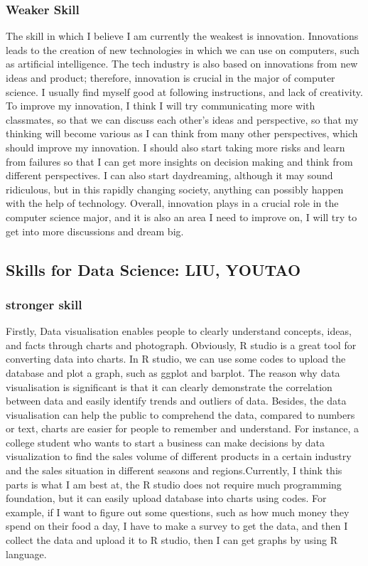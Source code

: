 \documentclass[a4paper, 11pt]{report}
\begin{document}
\subsubsection{Weaker Skill}	
	The skill in which I believe I am currently the weakest is innovation. Innovations leads to the creation of new technologies in which we can use on computers, such as artificial intelligence. The tech industry is also based on innovations from new ideas and product; therefore, innovation is crucial in the major of computer science. I usually find myself good at following instructions, and lack of creativity. To improve my innovation, I think I will try communicating more with classmates, so that we can discuss each other’s ideas and perspective, so that my thinking will become various as I can think from many other perspectives, which should improve my innovation. I should also start taking more risks and learn from failures so that I can get more insights on decision making and think from different perspectives. I can also start daydreaming, although it may sound ridiculous, but in this rapidly changing society, anything can possibly happen with the help of technology. Overall, innovation plays in a crucial role in the computer science major, and it is also an area I need to improve on, I will try to get into more discussions and dream big.





\subsection{Skills for Data Science: LIU, YOUTAO}
\subsubsection{stronger skill}
	Firstly, Data visualisation enables people to clearly understand concepts, ideas, and facts through charts and photograph. Obviously, R studio is a great tool for converting data into charts. In R studio, we can use some codes to upload the database and plot a graph, such as ggplot and barplot. The reason why data visualisation is significant is that it can clearly demonstrate the correlation between data and easily identify trends and outliers of data. Besides, the data visualisation can help the public to comprehend the data, compared to numbers or text, charts are easier for people to remember and understand. For instance, a college student who wants to start a business can make decisions by data visualization to find the sales volume of different products in a certain industry and the sales situation in different seasons and regions.Currently, I think this parts is what I am best at, the R studio does not require much programming foundation, but it can easily upload database into charts using codes. For example, if I want to figure out some questions, such as how much money they spend on their food a day, I have to make a survey to get the data, and then I collect the data and upload it to R studio, then I can get graphs by using R language.
\end{document}
